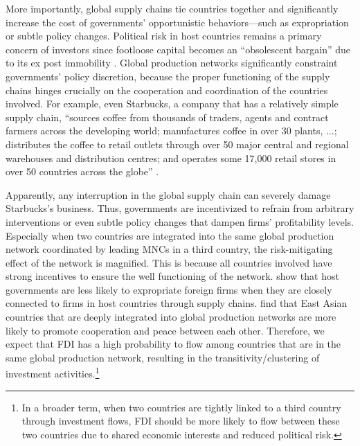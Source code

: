 \documentclass[reqno,onecolumn,letterpaper,12pt]{article}
\begin{document}
More importantly, global supply chains tie countries together and significantly increase the cost of governments' opportunistic behaviors---such as expropriation or subtle policy changes. Political risk in host countries remains a primary concern of investors since footloose capital becomes an ``obsolescent bargain'' due to its ex post immobility \citep{Vernon:1971,Vernon:1980}. Global production networks significantly constraint governments' policy discretion, because the proper functioning of the supply chains hinges crucially on the cooperation and coordination of the countries involved. For example, even Starbucks, a company that has a relatively simple supply chain, ``sources coffee from thousands of traders, agents and contract farmers across the developing world; manufactures coffee in over 30 plants, ...; distributes the coffee to retail outlets through over 50 major central and regional warehouses and distribution centres; and operates some 17,000 retail stores in over 50 countries across the globe'' \citep[142]{UNCTAD:2013}.

Apparently, any interruption in the global supply chain can severely damage Starbucks's business. Thus, governments are incentivized to refrain from arbitrary interventions or even subtle policy changes that dampen firms' profitability levels. Especially when two countries are integrated into the same global production network coordinated by leading MNCs in a third country, the risk-mitigating effect of the network is magnified. This is because all countries involved have strong incentives to ensure the well functioning of the network. \citet{johns2016under} show that host governments are less likely to expropriate foreign firms when they are closely connected to firms in host countries through supply chains. \citet{Kim_Solingen:2017} find that East Asian countries that are deeply integrated into global production networks are more likely to promote cooperation and peace between each other. Therefore, we expect that FDI has a high probability to flow among countries that are in the same global production network, resulting in the transitivity/clustering of investment activities.\footnote{In a broader term, when two countries are tightly linked to a third country through investment flows, FDI should be more likely to flow between these two countries due to shared economic interests and reduced political risk. }
\end{document}
